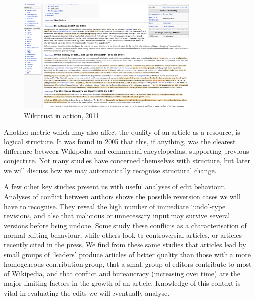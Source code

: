 \begin{figure}
  \centering
  \includegraphics[width=0.8\textwidth,clip=true,resolution=300]{img/wikitrust.png}
  \caption{Wikitrust in action, 2011}
  \label{fig:wikitrust}
\end{figure}

Another metric which may also affect the quality of an article as a
resource, is logical structure. It was found in 2005 that this, if
anything, was the clearest difference between Wikipedia and commercial
encyclopedias,\cite{Giles2005} supporting previous
conjecture.\cite{Denning2005} Not many studies have concerned
themselves with structure, but later we will discuss how we may
automatically recognise structural change.

A few other key studies present us with useful analyses of edit
behaviour. Analyses of conflict between authors shows the possible
reversion cases we will have to recognise. They reveal the high number
of immediate `undo'-type revisions, and also that malicious or
unnecessary input may survive several versions before being
undone. Some study these conflicts as a characterisation of normal
editing
behaviour,\cite{Kittur2007}\cite{Kittur2009}\cite{Kittur2010}\cite{Potthast2008}
while others look to controversial articles,\cite{Iba2010} or articles
recently cited in the press.\cite{Lih2004} We find from these same
studies that articles lead by small groups of `leaders' produce
articles of better quality than those with a more homogeneous
contribution group, that a small group of editors contribute to most
of Wikipedia, and that conflict and bureaucracy (increasing over time)
are the major limiting factors in the growth of an
article.\cite{Suh2009} Knowledge of this context is vital in
evaluating the edits we will eventually analyse.
